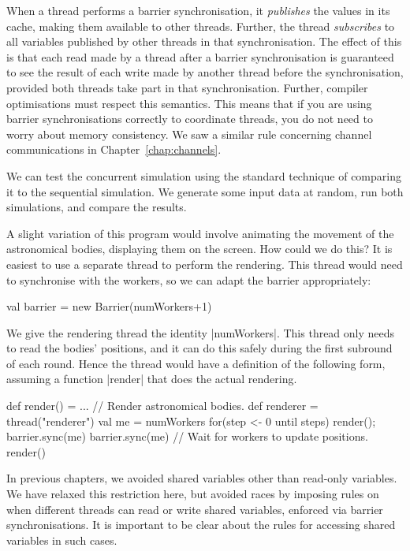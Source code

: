 When a thread performs a barrier synchronisation,
it \emph{publishes} the values in its cache, making them
available to other threads.  Further, the
thread \emph{subscribes} to all variables published by other
threads in that synchronisation.  The effect of this is that each read made by
a thread after a barrier synchronisation is guaranteed to see the result of
each write made by another thread before the synchronisation, provided both
threads take part in that synchronisation.  Further, compiler optimisations
must respect this semantics.  This means that if you are using barrier
synchronisations correctly to coordinate threads, you do not need to worry
about memory consistency.  We saw a similar rule concerning channel
communications in Chapter~\ref{chap:channels}.


We can test the concurrent simulation using the standard technique of
comparing it to the sequential simulation.  We generate some input data at
random, run both simulations, and compare the results. 

A slight variation of this program would involve animating the movement of the
astronomical bodies, displaying them on the screen.  How could we do this?  It
is easiest to use a separate thread to perform the rendering.  This thread
would need to synchronise with the workers, so we can adapt the barrier
appropriately: 
%
\begin{scala}
  val barrier = new Barrier(numWorkers+1)
\end{scala}
%
We  give the rendering thread the identity |numWorkers|.  This thread only
needs to read the bodies' positions, and it can do this safely during the
first subround of each round.  Hence the thread would have a definition of the
following form, assuming a function |render| that does the actual rendering.
%
\begin{scala}
  def render() = ... // Render astronomical bodies.
  def renderer = thread("renderer"){
    val me = numWorkers
    for(step <- 0 until steps){
      render(); barrier.sync(me)
      barrier.sync(me) // Wait for workers to update positions.
    }
    render()
  }   
\end{scala}

In previous chapters, we avoided shared variables other than read-only
variables.  We have relaxed this restriction here, but avoided races by
imposing rules on when different threads can read or write shared variables,
enforced via barrier synchronisations.  It is important to be clear about the
rules for accessing shared variables in such cases.


